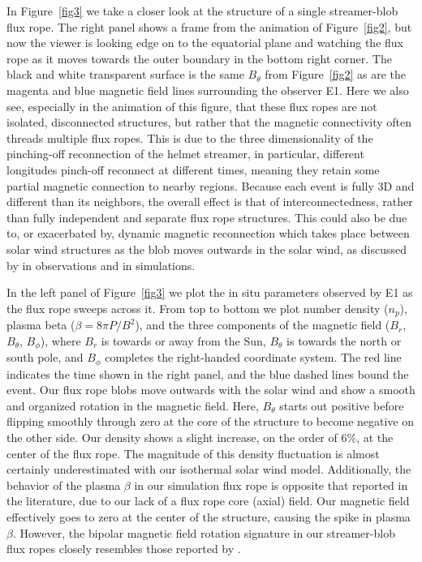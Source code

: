 \documentclass[preprint]{aastex62}
\begin{document}
In Figure~\ref{fig3} we take a closer look at the structure of a
single streamer-blob flux rope. The right panel shows a frame from
the animation of Figure~\ref{fig2}, but now the viewer is looking
edge on to the equatorial plane and watching the flux rope as it
moves towards the outer boundary in the bottom right corner. The
black and white transparent surface is the same $B_\theta$ from
Figure~\ref{fig2} as are the magenta and blue magnetic field lines
surrounding the observer E1. Here we also see, especially in the
animation of this figure, that these flux ropes are not isolated,
disconnected structures, but rather that the magnetic connectivity
often threads multiple flux ropes. This is due to the three dimensionality of the
 pinching-off reconnection of the helmet streamer, in particular,
  different longitudes pinch-off reconnect at different
times, meaning they retain some partial magnetic connection to
nearby regions. Because each event is fully 3D and different than
its neighbors, the overall effect is that of interconnectedness,
rather than fully independent and separate flux rope structures.
This could also be due to, or exacerbated by, dynamic magnetic
reconnection which takes place between solar wind structures as the
blob moves outwards in the solar wind, as discussed by
\citet{Gosling2006hcsrxn} in observations and \citet{Higginson2017a}
in simulations.


In the left panel of Figure~\ref{fig3} we plot the in situ parameters
observed by E1 as the flux rope sweeps across it. From top to bottom
we plot number density ($n_p$), plasma beta ($\beta=8\pi P/B^2$),
and the three components of the magnetic field ($B_r$, $B_\theta$,
$B_\phi$), where $B_r$ is towards or away from the Sun, $B_\theta$
is towards the north or south pole, and  $B_\phi$ completes the
right-handed coordinate system. The red line indicates the time
shown in the right panel, and the blue dashed lines bound the
event. Our flux rope blobs move outwards with the solar wind and
show a smooth and organized rotation in the magnetic field. Here,
$B_\theta$ starts out positive before flipping smoothly through
zero at the core of the structure to become negative on the other
side. Our density shows a slight increase, on the order of 6\%, at
the center of the flux rope. The magnitude of this density fluctuation
is almost certainly underestimated with our isothermal solar wind model.
Additionally, the behavior of the plasma $\beta$ in our simulation
flux rope is opposite that reported in the literature, due to our
lack of a flux rope core (axial) field. Our magnetic field effectively
goes to zero at the center of the structure, causing the spike in
plasma $\beta$. However, the bipolar magnetic field rotation signature
in our streamer-blob flux ropes closely resembles those reported
by \citet{Cartwright2008}.
\end{document}
